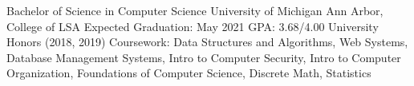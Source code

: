 

\begin{cventries}

  \cventry
    {Bachelor of Science in Computer Science} %
    {University of Michigan Ann Arbor, College of LSA} %
    {Expected Graduation: May 2021}
    {GPA: 3.68/4.00} %
    {
        University Honors (2018, 2019) \newline
        Coursework: Data Structures and Algorithms, Web Systems, Database Management Systems, Intro to Computer Security, Intro to Computer Organization, Foundations of Computer Science, Discrete Math, Statistics
    }
\end{cventries}
